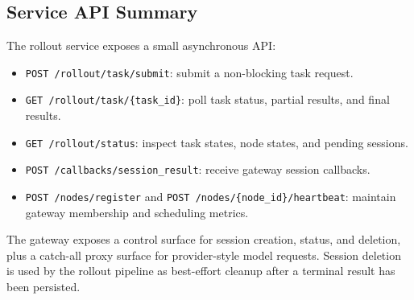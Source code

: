 \subsection{Service API Summary}

The rollout service exposes a small asynchronous API:

\begin{itemize}
    \item \texttt{POST /rollout/task/submit}: submit a non-blocking task request.
    \item \texttt{GET /rollout/task/\{task\_id\}}: poll task status, partial results, and final results.
    \item \texttt{GET /rollout/status}: inspect task states, node states, and pending sessions.
    \item \texttt{POST /callbacks/session\_result}: receive gateway session callbacks.
    \item \texttt{POST /nodes/register} and \texttt{POST /nodes/\{node\_id\}/heartbeat}: maintain gateway membership and scheduling metrics.
\end{itemize}

The gateway exposes a control surface for session creation, status, and deletion, plus a catch-all proxy surface for provider-style model requests. Session deletion is used by the rollout pipeline as best-effort cleanup after a terminal result has been persisted.
